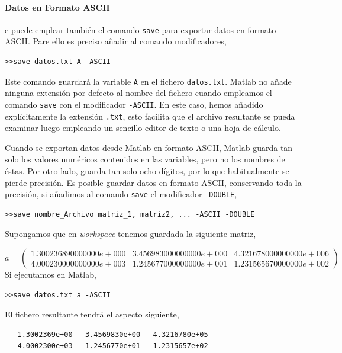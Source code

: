 \paragraph*{Datos en Formato ASCII} e puede emplear también el comando \texttt{save} para exportar datos en formato ASCII. Pare ello es preciso añadir al comando modificadores,
\begin{verbatim}
>>save datos.txt A -ASCII
\end{verbatim}

Este comando guardará la variable \texttt{A} en el fichero \texttt{datos.txt}. Matlab no añade ninguna extensión por defecto al nombre del fichero cuando empleamos el comando \texttt{save} con el modificador \texttt{-ASCII}. En este caso, hemos añadido explícitamente la extensión \texttt{.txt}, esto facilita que el archivo resultante se pueda examinar luego empleando un sencillo editor de texto o una hoja de cálculo.


Cuando se exportan datos desde Matlab en formato ASCII, Matlab guarda tan solo los valores numéricos contenidos en las variables, pero no los nombres de éstas. Por otro lado, guarda tan solo ocho dígitos, por lo que habitualmente se pierde precisión. Es posible guardar  datos en formato ASCII, conservando toda la precisión, si añadimos al comando \texttt{save} el modificador \texttt{-DOUBLE}, 
\begin{verbatim}
>>save nombre_Archivo matriz_1, matriz2, ... -ASCII -DOUBLE
\end{verbatim}


Supongamos que en \emph{workspace} tenemos guardada la siguiente matriz,

\begin{equation*}
a=
\begin{pmatrix}
1.300236890000000e+000&3.456983000000000e+000&4.321678000000000e+006\\
4.000230000000000e+003&1.245677000000000e+001&1.231565670000000e+002
\end{pmatrix}
\end{equation*}
Si ejecutamos en Matlab, 
\begin{verbatim}
>>save datos.txt a -ASCII
\end{verbatim}

El fichero resultante tendrá el aspecto siguiente,
\begin{verbatim}
   1.3002369e+00   3.4569830e+00   4.3216780e+05
   4.0002300e+03   1.2456770e+01   1.2315657e+02
\end{verbatim}

